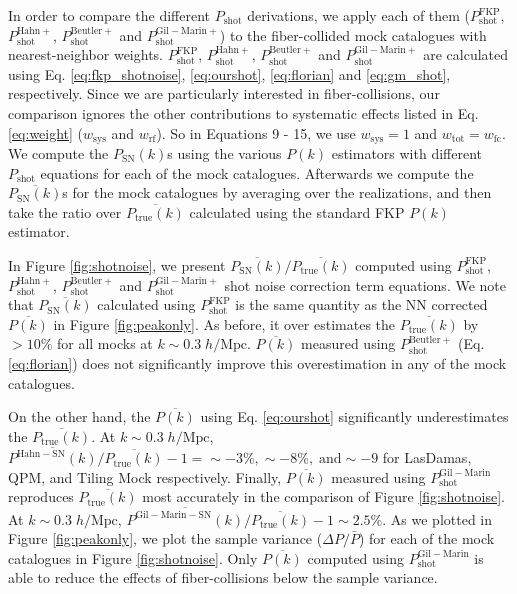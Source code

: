 \documentclass{emulateapj}
\begin{document}
In order to compare the different $P_\mathrm{shot}$ derivations, we apply each of them ($P^\mathrm{FKP}_\mathrm{shot}$, $P^\mathrm{Hahn+}_\mathrm{shot}$, $P^\mathrm{Beutler+}_\mathrm{shot}$ and $P^\mathrm{Gil-Marin+}_\mathrm{shot}$) to the fiber-collided mock catalogues with nearest-neighbor weights. $P^\mathrm{FKP}_\mathrm{shot}$, $P^\mathrm{Hahn+}_\mathrm{shot}$, $P^\mathrm{Beutler+}_\mathrm{shot}$ and $P^\mathrm{Gil-Marin+}_\mathrm{shot}$ are calculated using Eq. \ref{eq:fkp_shotnoise}, \ref{eq:ourshot}, \ref{eq:florian} and \ref{eq:gm_shot}, respectively. Since we are particularly interested in fiber-collisions, our comparison ignores the other contributions to systematic effects listed in Eq. \ref{eq:weight} ($w_\mathrm{sys}$ and $w_\mathrm{rf}$). So in Equations 9 - 15, we use $w_\mathrm{sys} = 1$ and $w_\mathrm{tot} = w_\mathrm{fc}$. We compute the $P_\mathrm{SN}(k)$s using the various $P(k)$ estimators with different $P_\mathrm{shot}$ equations for each of the mock catalogues. Afterwards we compute the $\overline{P_\mathrm{SN}(k)}$s for the mock catalogues by averaging over the realizations, and then take the ratio over $\overline{P_\mathrm{true}(k)}$ calculated using the standard FKP $P(k)$ estimator. 

In Figure \ref{fig:shotnoise}, we present $\overline{P_\mathrm{SN}(k)}/\overline{P_\mathrm{true}(k)}$ computed using $P^\mathrm{FKP}_\mathrm{shot}$, $P^\mathrm{Hahn+}_\mathrm{shot}$, $P^\mathrm{Beutler+}_\mathrm{shot}$ and $P^\mathrm{Gil-Marin+}_\mathrm{shot}$ shot noise correction term equations. We note that $\overline{P_\mathrm{SN}(k)}$ calculated using $P^\mathrm{FKP}_\mathrm{shot}$ is the same quantity as the NN corrected $\overline{P(k)}$ in Figure \ref{fig:peakonly}. As before, it over estimates the $\overline{P_\mathrm{true}(k)}$ by $> 10 \%$ for all mocks at $k \sim 0.3 \; h/\mathrm{Mpc}$. $\overline{P(k)}$ measured using $P^\mathrm{Beutler+}_\mathrm{shot}$ (Eq. \ref{eq:florian}) does not significantly improve this overestimation in any of the mock catalogues. 

On the other hand, the $\overline{P(k)}$ using Eq. \ref{eq:ourshot} significantly underestimates the $\overline{P_\mathrm{true}(k)}$. At $k \sim 0.3 \; h/\mathrm{Mpc}$, $\overline{P^\mathrm{Hahn-SN}(k)}/\overline{P_\mathrm{true}(k)} - 1 = \sim -3 \%, \sim -8 \%, \;\mathrm{and} \sim -9$ for LasDamas, QPM, and Tiling Mock respectively. Finally, $\overline{P(k)}$ measured using $P^\mathrm{Gil-Marin}_\mathrm{shot}$ reproduces $\overline{P_\mathrm{true}(k)}$ most accurately in the comparison of Figure \ref{fig:shotnoise}. At $k \sim 0.3 \; h/\mathrm{Mpc}$, $\overline{P^\mathrm{Gil-Marin-SN}(k)}/\overline{P_\mathrm{true}(k)} -1 \sim 2.5 \%$. As we plotted in Figure \ref{fig:peakonly}, we plot the sample variance ($\Delta P/\bar{P}$) for each of the mock catalogues in Figure \ref{fig:shotnoise}. Only $\overline{P(k)}$ computed using $P^\mathrm{Gil-Marin}_\mathrm{shot}$ is able to reduce the effects of fiber-collisions below the sample variance. 
\end{document}
